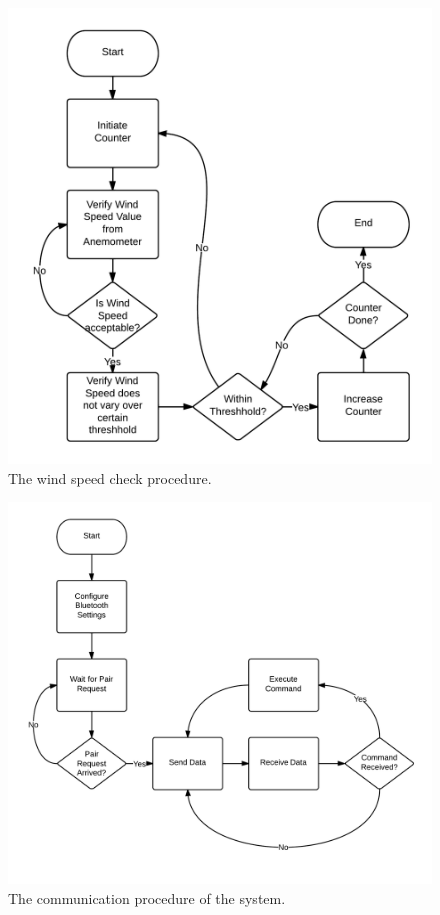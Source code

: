 	\begin{figure}[H]
		\centering
			\includegraphics[scale=0.20]{img/flowchart-windspeedcheck}
		\caption{The wind speed check procedure.}
	\end{figure}
	\begin{figure}[H]
		\centering
			\includegraphics[scale=0.20]{img/flowchart-communication-bluetooth}
		\caption{The communication procedure of the system.}
	\end{figure}

\newpage